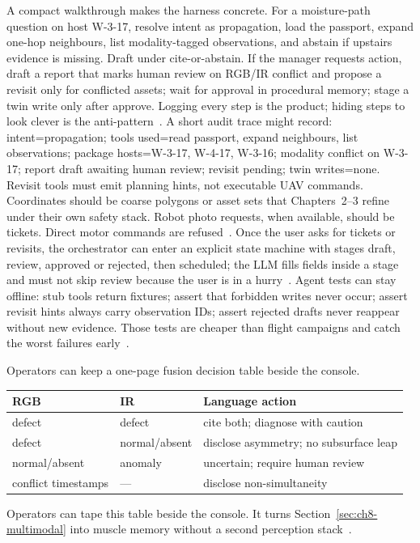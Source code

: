 A compact walkthrough makes the harness concrete. For a moisture-path question on host W-3-17, resolve intent as propagation, load the passport, expand one-hop neighbours, list modality-tagged observations, and abstain if upstairs evidence is missing. Draft under cite-or-abstain. If the manager requests action, draft a report that marks human review on RGB/IR conflict and propose a revisit only for conflicted assets; wait for approval in procedural memory; stage a twin write only after approve. Logging every step is the product; hiding steps to look clever is the anti-pattern~\cite{yao2023react,wang2024surveyagents,luo2025llmdtrobot,gao2026ifcagent,lu2026highwaymas}. A short audit trace might record: intent=propagation; tools used=read passport, expand neighbours, list observations; package hosts=W-3-17, W-4-17, W-3-16; modality conflict on W-3-17; report draft awaiting human review; revisit pending; twin writes=none. Revisit tools must emit planning hints, not executable UAV commands. Coordinates should be coarse polygons or asset sets that Chapters~2--3 refine under their own safety stack. Robot photo requests, when available, should be tickets. Direct motor commands are refused~\cite{luo2025llmdtrobot}. Once the user asks for tickets or revisits, the orchestrator can enter an explicit state machine with stages draft, review, approved or rejected, then scheduled; the LLM fills fields inside a stage and must not skip review because the user is in a hurry~\cite{gao2026ifcagent,zhang2025llmagentschema,rawat2025llmmas,lu2026highwaymas}. Agent tests can stay offline: stub tools return fixtures; assert that forbidden writes never occur; assert revisit hints always carry observation IDs; assert rejected drafts never reappear without new evidence. Those tests are cheaper than flight campaigns and catch the worst failures early~\cite{wang2024surveyagents,li2024surveymultiagent,ma2026tenquestions}.



Operators can keep a one-page fusion decision table beside the console.
\begin{center}
\begin{tabular}{llp{5.2cm}}
\hline
RGB & IR & Language action \\
\hline
defect & defect & cite both; diagnose with caution \\
defect & normal/absent & disclose asymmetry; no subsurface leap \\
normal/absent & anomaly & uncertain; require human review \\
conflict timestamps & --- & disclose non-simultaneity \\
\hline
\end{tabular}
\end{center}
\vspace{0.5em}
Operators can tape this table beside the console. It turns Section~\ref{sec:ch8-multimodal} into muscle memory without a second perception stack~\cite{zhao2024facade,zhao2026physical}.

